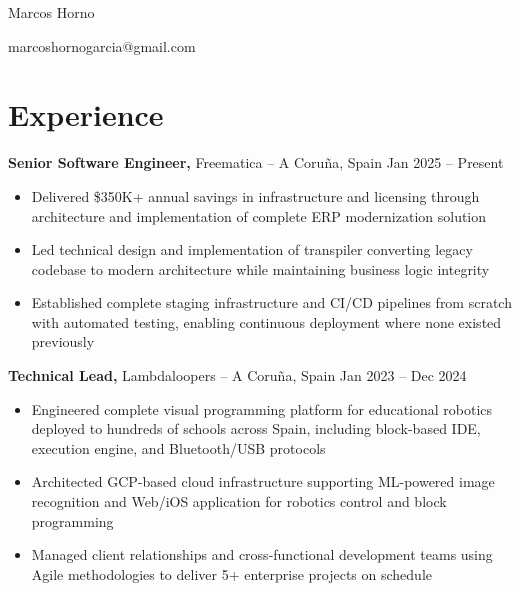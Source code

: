 \documentclass[11pt]{article}       %
\begin{document}
\centerline{\Huge Marcos Horno}

\vspace{5pt}

\centerline{\color{professionalgreen}marcoshornogarcia@gmail.com}

\vspace{-10pt}

\section*{Experience}
\textbf{Senior Software Engineer,} Freematica -- A Coruña, Spain \hfill Jan 2025 -- Present \\
\vspace{-9pt}
\begin{itemize}
  \item Delivered \$350K+ annual savings in infrastructure and licensing through architecture and implementation of complete ERP modernization solution
  \item Led technical design and implementation of transpiler converting legacy codebase to modern architecture while maintaining business logic integrity
  \item Established complete staging infrastructure and CI/CD pipelines from scratch with automated testing, enabling continuous deployment where none existed previously
\end{itemize}

\textbf{Technical Lead,} Lambdaloopers -- A Coruña, Spain \hfill Jan 2023 -- Dec 2024 \\
\vspace{-9pt}
\begin{itemize}
  \item Engineered complete visual programming platform for educational robotics deployed to hundreds of schools across Spain, including block-based IDE, execution engine, and Bluetooth/USB protocols
  \item Architected GCP-based cloud infrastructure supporting ML-powered image recognition and Web/iOS application for robotics control and block programming
  \item Managed client relationships and cross-functional development teams using Agile methodologies to deliver 5+ enterprise projects on schedule
\end{itemize}
\end{document}
